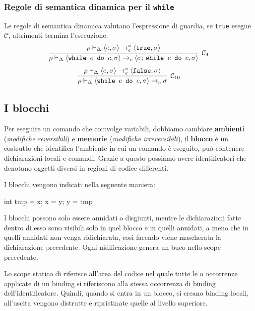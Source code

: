 \documentclass[oneside,a4paper,11pt]{book}
\theoremstyle{italicstyle}
\theoremstyle{normStyle}
\begin{document}
\subsubsection{Regole di semantica dinamica per il \texttt{while}}
Le regole di semantica dinamica valutano l'espressione di guardia, se \verb|true| 
esegue $\mathcal{C}$, altrimenti termina l'esecuzione.
\[
  \infer[\mathcal{C}_9]
  {
    \rho \vdash_\Delta \langle \texttt{while }e \texttt{ do } c, \sigma\rangle \rightarrow_c \langle c\,;\, \texttt{while }e \texttt{ do } c, \sigma\rangle
  }
  {
    \rho \vdash_\Delta \langle e, \sigma\rangle \rightarrow^*_e \langle \texttt{true}, \sigma\rangle
  }
\]
\[
  \infer[\mathcal{C}_{10}]
  {
    \rho \vdash_\Delta \langle \texttt{while }e \texttt{ do } c, \sigma\rangle \rightarrow_c \sigma
  }
  {
    \rho \vdash_\Delta \langle e, \sigma\rangle \rightarrow^*_e \langle \texttt{false}, \sigma\rangle
  }
\]
\subsection{I blocchi}
Per eseguire un comando che coinvolge variabili, dobbiamo cambiare \textbf{ambienti} (\textit{modifiche 
reversibili}) e \textbf{memorie} (\textit{modifiche irreversibili}), il \textbf{blocco} 
è un costrutto che identifica l'ambiente in cui un comando è eseguito, può contenere 
dichiarazioni locali e comandi. Grazie a questo possiamo avere identificatori che denotano 
oggetti diversi in regioni di codice differenti.

I blocchi vengono indicati nella seguente maniera:
\begin{algorithm}
  { int tmp = x;
    x = y;
    y = tmp
  }
\end{algorithm}
I blocchi possono solo essere annidati o disgiunti, mentre le dichiarazioni fatte 
dentro di esso sono visibili solo in quel blocco e in quelli annidati, a meno che in quelli annidati non 
venga ridichiarata, così facendo viene mascherata la dichiarazione precedente. Ogni nidificazione 
genera un buco nello scope precedente.
\begin{tcolorbox}[title = {Scope statico nei blocchi}]
  Lo scope statico di riferisce all'area del codice nel quale tutte le o
  occorrenze applicate di un binding si riferiscono alla stessa occorrenza di binding 
  dell'identificatore. Quindi, quando si entra in un blocco, si creano binding locali, all'uscita vengono 
  distrutte e ripristinate quelle al livello superiore.
\end{tcolorbox}
\end{document}
